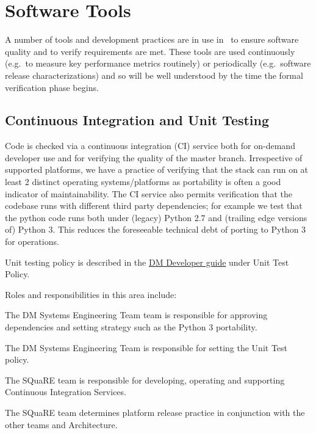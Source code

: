 \section{Software Tools}

A number of tools and development practices are in use in \product\ to ensure software quality and to verify requirements are met. These tools are used continuously (e.g.\ to measure key performance metrics routinely) or periodically (e.g.\ software release characterizations) and so will be well understood by the time the formal verification phase begins.

\subsection{Continuous Integration and Unit Testing}

Code is checked via a continuous integration (CI) service both for on-demand developer use and for verifying the quality of the master branch. Irrespective of supported platforms, we have a practice of verifying that the stack can run on at least 2 distinct operating systems/platforms as portability is often a good indicator of maintainability. The CI service also permits verification that the codebase runs with different third party dependencies; for example we test that the python code runs both under (legacy) Python 2.7 and (trailing edge versions of) Python 3. This reduces the foreseeable technical debt of porting to Python 3 for operations.

Unit testing policy is described in the \href{https://developer.lsst.io}{DM Developer guide} under Unit Test Policy.

Roles and responsibilities in this area include:

\begin{itemize_single}

\item The DM Systems Engineering Team  team is responsible for approving dependencies and setting strategy such as the Python 3 portability.

\item The DM Systems Engineering  Team is responsible for setting the Unit Test policy.

\item The SQuaRE team is responsible for developing, operating and supporting Continuous Integration Services.

\item The SQuaRE team determines platform release practice in conjunction with the other teams and Architecture.

\end{itemize_single}

